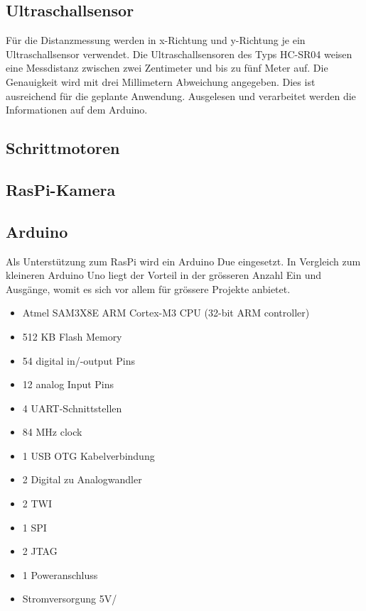 \documentclass[a4paper]{report}
\begin{document}
\subsection{Ultraschallsensor}
Für die Distanzmessung werden in x-Richtung und y-Richtung je ein Ultraschallsensor verwendet. Die Ultraschallsensoren des Typs HC-SR04 weisen eine Messdistanz zwischen zwei Zentimeter und bis zu fünf Meter auf. Die Genauigkeit wird mit drei Millimetern Abweichung angegeben. Dies ist ausreichend für die geplante Anwendung. Ausgelesen und verarbeitet werden die Informationen auf dem Arduino.

\subsection{Schrittmotoren}

\subsection{RasPi-Kamera}

\subsection{Arduino}

Als Unterstützung zum RasPi wird ein Arduino Due eingesetzt. In Vergleich zum kleineren Arduino Uno liegt der Vorteil in der grösseren Anzahl Ein und Ausgänge, womit es sich vor allem für grössere Projekte anbietet.



\begin{itemize}[noitemsep]
	\item Atmel SAM3X8E ARM Cortex-M3 CPU (32-bit ARM controller)
	\item 512 KB Flash Memory
	\item 54 digital in/-output Pins
	\item 12 analog Input Pins
	\item 4 UART-Schnittstellen
	\item 84 MHz clock
	\item 1 USB OTG Kabelverbindung
	\item 2 Digital zu Analogwandler
	\item 2 TWI
	\item 1 SPI
	\item 2 JTAG
	\item 1 Poweranschluss
	\item Stromversorgung 5V/
\end{itemize}\parencite{https://store.arduino.cc/usa/arduino-due} %
\end{document}
